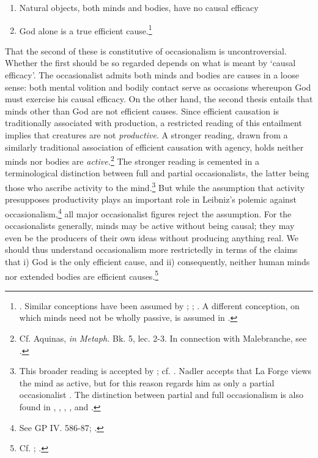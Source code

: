 \documentclass[]{article}
\begin{document}
\begin{enumerate}
	\item Natural objects, both minds and bodies, have no causal efficacy
	\item God alone is a true efficient cause.\footnote{\autocite[39]{Nadler2005}. Similar conceptions have been assumed by \autocite[45-46]{Pyle2003}; \autocite[174]{Battail1973}; \autocite[288]{Winkler2011}. A different conception, on which minds need not be wholly passive, is assumed in \autocite[358]{Radner1993}.}
\end{enumerate}

That the second of these is constitutive of occasionalism is uncontroversial. Whether the first should be so regarded depends on what is meant by `causal efficacy'. The occasionalist admits both minds and bodies are causes in a loose sense: both mental volition and bodily contact serve as occasions whereupon God must exercise his causal efficacy. On the other hand, the second thesis entails that minds other than God are not efficient causes. Since efficient causation is traditionally associated with production, a restricted reading of this entailment implies that creatures are not \emph{productive}. A stronger reading, drawn from a similarly traditional association of efficient causation with agency, holds neither minds nor bodies are \emph{active.}\footnote{Cf. Aquinas, \emph{in Metaph.} Bk. 5, lec. 2-3. In connection with Malebranche, see \autocite[255-256]{Baker2005}.} The stronger reading is cemented in a terminological distinction between full and partial occasionalists, the latter being those who ascribe activity to the mind.\footnote{This broader reading is accepted by \autocite{Nadler2005}; cf. \autocite[288]{Winkler2011}. Nadler accepts that La Forge views the mind as active, but for this reason regards him as only a partial occasionalist \autocite[227]{Nadler1998}. The distinction between partial and full occasionalism is also found in \autocite{Radner1993}, \autocite{Garber1987}, \autocite{Clarke2000}, \autocite{Bardout2002}, and \autocite{Kolesnik2006}.} But while the assumption that activity presupposes productivity plays an important role in Leibniz's polemic against occasionalism,\footnote{See GP IV. 586-87; \autocite{Rutherford1993}.} all major occasionalist figures reject the assumption. For the occasionalists generally, minds may be active without being causal; they may even be the producers of their own ideas without producing anything real. We should thus understand occasionalism more restrictedly in terms of the claims that i) God is the only efficient cause, and ii) consequently, neither human minds nor extended bodies are efficient causes.\footnote{Cf. \autocite[625-626]{Platt2011}; \autocite[101]{Gouhier1926}.}
\end{document}
